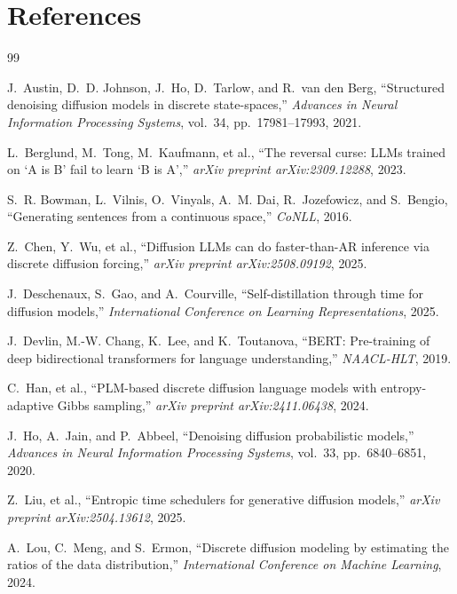 \documentclass[conference]{IEEEtran}
\begin{document}
\section{References}
\label{appendix:references}



\begin{thebibliography}{99}

J.~Austin, D.~D. Johnson, J.~Ho, D.~Tarlow, and R.~van den Berg,
``Structured denoising diffusion models in discrete state-spaces,''
\emph{Advances in Neural Information Processing Systems}, vol.~34, pp.~17981--17993, 2021.

L.~Berglund, M.~Tong, M.~Kaufmann, et al.,
``The reversal curse: LLMs trained on `A is B' fail to learn `B is A',''
\emph{arXiv preprint arXiv:2309.12288}, 2023.

S.~R. Bowman, L.~Vilnis, O.~Vinyals, A.~M. Dai, R.~Jozefowicz, and S.~Bengio,
``Generating sentences from a continuous space,''
\emph{CoNLL}, 2016.

Z.~Chen, Y.~Wu, et al.,
``Diffusion LLMs can do faster-than-AR inference via discrete diffusion forcing,''
\emph{arXiv preprint arXiv:2508.09192}, 2025.

J.~Deschenaux, S.~Gao, and A.~Courville,
``Self-distillation through time for diffusion models,''
\emph{International Conference on Learning Representations}, 2025.

J.~Devlin, M.-W. Chang, K.~Lee, and K.~Toutanova,
``BERT: Pre-training of deep bidirectional transformers for language understanding,''
\emph{NAACL-HLT}, 2019.

C.~Han, et al.,
``PLM-based discrete diffusion language models with entropy-adaptive Gibbs sampling,''
\emph{arXiv preprint arXiv:2411.06438}, 2024.

J.~Ho, A.~Jain, and P.~Abbeel,
``Denoising diffusion probabilistic models,''
\emph{Advances in Neural Information Processing Systems}, vol.~33, pp.~6840--6851, 2020.

Z.~Liu, et al.,
``Entropic time schedulers for generative diffusion models,''
\emph{arXiv preprint arXiv:2504.13612}, 2025.

A.~Lou, C.~Meng, and S.~Ermon,
``Discrete diffusion modeling by estimating the ratios of the data distribution,''
\emph{International Conference on Machine Learning}, 2024.


\end{thebibliography}
\end{document}
